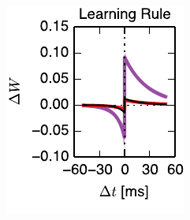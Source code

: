 \begin{figure}[t!]
\begin{subfigure}[T]{2.4in}
    \label{fig:fig3_add_nothr_trajectory}
  \end{subfigure}
  \begin{subfigure}[T]{1.45in}
    \includegraphics[width=\textwidth]{figures/ch4/fig3_add_nothr_stdp_rule}    
    \label{fig:fig3_add_nothr_stdp_rule}
  \end{subfigure}
  \begin{subfigure}[T]{1.45in}
    \hspace{.1in}

\end{subfigure}
\end{figure}
